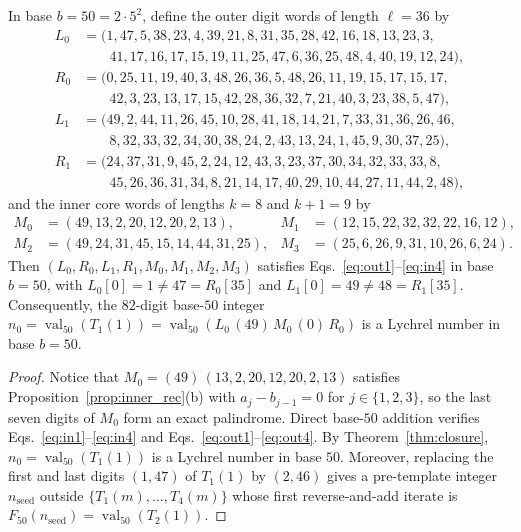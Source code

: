 \documentclass[12pt,reqno]{article}
\DeclareMathOperator{\val}{val}
\begin{document}
\begin{theorem}\label{thm:b50}
In base $b = 50 = 2 \cdot 5^2$, define the outer digit words of length $\ell = 36$ by
\begin{align*}
L_0 &= (1, 47, 5, 38, 23, 4, 39, 21, 8, 31, 35, 28, 42, 16, 18, 13, 23, 3,\\
&\phantom{=\ (} 41, 17, 16, 17, 15, 19, 11, 25, 47, 6, 36, 25, 48, 4, 40, 19, 12, 24),\\
R_0 &= (0, 25, 11, 19, 40, 3, 48, 26, 36, 5, 48, 26, 11, 19, 15, 17, 15, 17,\\
&\phantom{=\ (} 42, 3, 23, 13, 17, 15, 42, 28, 36, 32, 7, 21, 40, 3, 23, 38, 5, 47),\\
L_1 &= (49, 2, 44, 11, 26, 45, 10, 28, 41, 18, 14, 21, 7, 33, 31, 36, 26, 46,\\
&\phantom{=\ (} 8, 32, 33, 32, 34, 30, 38, 24, 2, 43, 13, 24, 1, 45, 9, 30, 37, 25),\\
R_1 &= (24, 37, 31, 9, 45, 2, 24, 12, 43, 3, 23, 37, 30, 34, 32, 33, 33, 8,\\
&\phantom{=\ (} 45, 26, 36, 31, 34, 8, 21, 14, 17, 40, 29, 10, 44, 27, 11, 44, 2, 48),
\end{align*}
and the inner core words of lengths $k = 8$ and $k+1 = 9$ by
\begin{align*}
M_0 &= (49, 13, 2, 20, 12, 20, 2, 13), & M_1 &= (12, 15, 22, 32, 32, 22, 16, 12),\\
M_2 &= (49, 24, 31, 45, 15, 14, 44, 31, 25), & M_3 &= (25, 6, 26, 9, 31, 10, 26, 6, 24).
\end{align*}
Then $(L_0, R_0, L_1, R_1, M_0, M_1, M_2, M_3)$ satisfies Eqs.~\eqref{eq:out1}--\eqref{eq:in4} in base $b = 50$, with $L_0[0] = 1 \neq 47 = R_0[35]$ and $L_1[0] = 49 \neq 48 = R_1[35]$. Consequently, the $82$-digit base-$50$ integer $n_0 = \val_{50}(T_1(1)) = \val_{50}(L_0 \, (49) \, M_0 \, (0) \, R_0)$ is a Lychrel number in base $b = 50$.
\end{theorem}

\begin{proof}
Notice that $M_0 = (49) \, (13, 2, 20, 12, 20, 2, 13)$ satisfies Proposition~\ref{prop:inner_rec}(b) with $a_j - b_{j-1} = 0$ for $j \in \{1, 2, 3\}$, so the last seven digits of $M_0$ form an exact palindrome. Direct base-$50$ addition verifies Eqs.~\eqref{eq:in1}--\eqref{eq:in4} and Eqs.~\eqref{eq:out1}--\eqref{eq:out4}. By Theorem~\ref{thm:closure}, $n_0 = \val_{50}(T_1(1))$ is a Lychrel number in base $50$. Moreover, replacing the first and last digits $(1, 47)$ of $T_1(1)$ by $(2, 46)$ gives a pre-template integer $n_{\mathrm{seed}}$ outside $\{T_1(m), \ldots, T_4(m)\}$ whose first reverse-and-add iterate is $F_{50}(n_{\mathrm{seed}}) = \val_{50}(T_2(1))$.
\end{proof}
\end{document}
